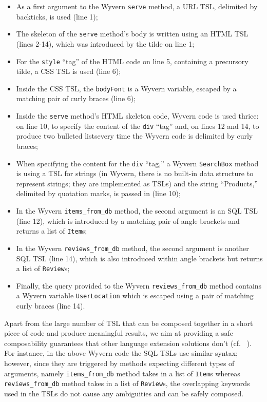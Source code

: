 \begin{itemize}
\item As a first argument to the Wyvern \lstinline{serve} method, a URL TSL, delimited by backticks, is used (line 1);
\item The skeleton of the \lstinline{serve} method's body is written using an HTML TSL (lines 2-14), which was introduced by the tilde on line 1;
\item For the \lstinline{style} ``tag'' of the HTML code on line 5, containing a precursory tilde, a CSS TSL is used (line 6);
\item Inside the CSS TSL, the \lstinline{bodyFont} is a Wyvern variable, escaped by a matching pair of curly braces (line 6);
\item Inside the \lstinline{serve} method's HTML skeleton code, Wyvern code is used thrice: on line 10, to specify the content of the \lstinline{div} ``tag'' and, on lines 12 and 14, to produce two bulleted lists\textemdash every time the Wyvern code is delimited by curly braces;
\item When specifying the content for the \lstinline{div} ``tag,'' a Wyvern \lstinline{SearchBox} method is using a TSL for strings (in Wyvern, there is no built-in data structure to represent strings; they are implemented as TSLs) and the string ``Products,'' delimited by quotation marks, is passed in (line 10);
\item In the Wyvern \lstinline{items_from_db} method, the second argument is an SQL TSL (line 12), which is introduced by a matching pair of angle brackets and returns a list of \lstinline{Item}s;
\item In the Wyvern \lstinline{reviews_from_db} method, the second argument is another SQL TSL (line 14), which is also introduced within angle brackets but returns a list of \lstinline{Review}s;
\item Finally, the query provided to the Wyvern \lstinline{reviews_from_db} method contains a Wyvern variable \lstinline{UserLocation} which is escaped using a pair of matching curly braces (line 14).
\end{itemize}

Apart from the large number of TSL that can be composed together in a short piece of code and produce meaningful results, we aim at providing a safe composability guarantees that other language extension solutions don't (cf.~\cite{Erdweg:2013:FEL:2517208.2517210} ). For instance, in the above Wyvern code the SQL TSLs use similar syntax; however, since they are triggered by methods expecting different types of arguments, namely \lstinline{items_from_db} method takes in a list of \lstinline{Item}s whereas \lstinline{reviews_from_db} method takes in a list of \lstinline{Review}s, the overlapping keywords used in the TSLs do not cause any ambiguities and can be safely composed.


